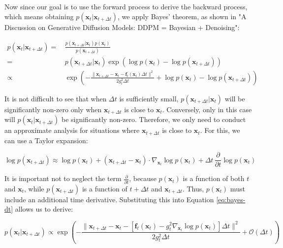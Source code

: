 Now since our goal is to use the forward process to derive the backward process, which means obtaining \( p(\mathbf{x}_t|\mathbf{x}_{t+\Delta t}) \), we apply Bayes' theorem, as shown in "A Discussion on Generative Diffusion Models: DDPM = Bayesian + Denoising":~\cite{noauthor_ddpm_nodate}

\begin{equation}
\begin{aligned}
p(\mathbf{x}_t|\mathbf{x}_{t+\Delta t}) =&\, \frac{p(\mathbf{x}_{t+\Delta t}|\mathbf{x}_t) p(\mathbf{x}_t)}{p(\mathbf{x}_{t+\Delta t})} \\
=&\, p(\mathbf{x}_{t+\Delta t}|\mathbf{x}_t) \exp\left(\log p(\mathbf{x}_t) - \log p(\mathbf{x}_{t+\Delta t})\right) \\
\propto&\, \exp\left(-\frac{\|\mathbf{x}_{t+\Delta t} - \mathbf{x}_t - \mathbf{f}_t(\mathbf{x}_t) \Delta t\|^2}{2 g_t^2 \Delta t} + \log p(\mathbf{x}_t) - \log p(\mathbf{x}_{t+\Delta t})\right)
\end{aligned} \label{eq:bayes-dt}
\end{equation}

It is not difficult to see that when \( \Delta t \) is sufficiently small, \( p(\mathbf{x}_{t+\Delta t}|\mathbf{x}_t) \) will be significantly non-zero only when \( \mathbf{x}_{t+\Delta t} \) is close to \( \mathbf{x}_t \). Conversely, only in this case will \( p(\mathbf{x}_t|\mathbf{x}_{t+\Delta t}) \) be significantly non-zero. Therefore, we only need to conduct an approximate analysis for situations where \( \mathbf{x}_{t+\Delta t} \) is close to \( \mathbf{x}_t \). For this, we can use a Taylor expansion:

\begin{equation}
\log p(\mathbf{x}_{t+\Delta t}) \approx \log p(\mathbf{x}_t) + (\mathbf{x}_{t+\Delta t} - \mathbf{x}_t) \cdot \nabla_{\mathbf{x}_t} \log p(\mathbf{x}_t) + \Delta t \, \frac{\partial}{\partial t} \log p(\mathbf{x}_t)
\end{equation}

It is important not to neglect the term \( \frac{\partial}{\partial t} \), because \( p(\mathbf{x}_t) \) is a function of both \( t \) and \( \mathbf{x}_t \), while \( p(\mathbf{x}_{t+\Delta t}) \) is a function of \( t + \Delta t \) and \( \mathbf{x}_{t+\Delta t} \). Thus, \( p(\mathbf{x}_t) \) must include an additional time derivative. Substituting this into Equation \eqref{eq:bayes-dt} allows us to derive:

\begin{equation}
p(\mathbf{x}_t|\mathbf{x}_{t+\Delta t}) \propto \exp\left(-\frac{\|\mathbf{x}_{t+\Delta t} - \mathbf{x}_t - \left[\mathbf{f}_t(\mathbf{x}_t) - g_t^2 \nabla_{\mathbf{x}_t} \log p(\mathbf{x}_t) \right] \Delta t\|^2}{2 g_t^2 \Delta t} + \mathcal{O}(\Delta t)\right)
\end{equation}


